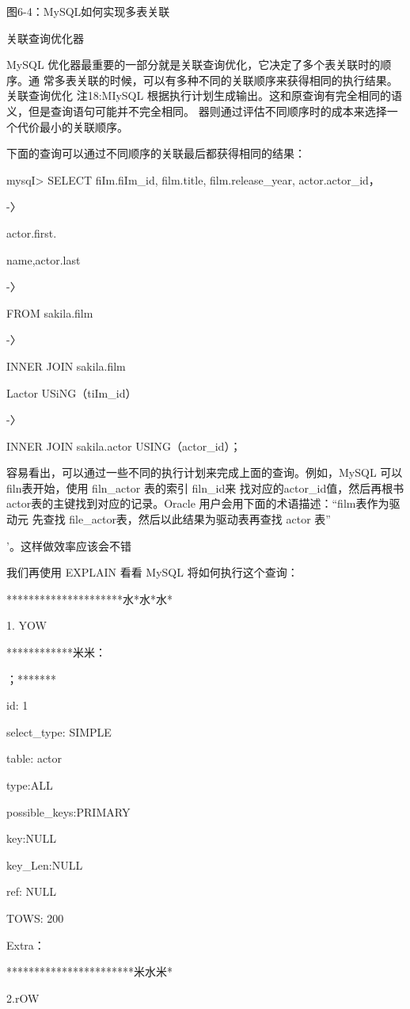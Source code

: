 图6-4：MySQL如何实现多表关联

关联查询优化器

MySQL 优化器最重要的一部分就是关联查询优化，它决定了多个表关联时的顺序。通
常多表关联的时候，可以有多种不同的关联顺序来获得相同的执行结果。关联查询优化
注18:MIySQL 根据执行计划生成输出。这和原查询有完全相同的语义，但是查询语句可能并不完全相同。
器则通过评估不同顺序时的成本来选择一个代价最小的关联顺序。

下面的查询可以通过不同顺序的关联最后都获得相同的结果：

mysqI> SELECT fiIm.fiIm\_id, film.title, film.release\_year, actor.actor\_id，

-〉

actor.first.

name,actor.last

-〉

FROM sakila.film

-〉

INNER JOIN sakila.film

Lactor USiNG（tiIm\_id）

-〉

INNER JOIN sakila.actor USING（actor\_id）；

容易看出，可以通过一些不同的执行计划来完成上面的查询。例如，MySQL 可以
filn表开始，使用 filn\_actor 表的索引 filn\_id来 找对应的actor\_id值，然后再根书
actor表的主键找到对应的记录。Oracle 用户会用下面的术语描述：“film表作为驱动元
先查找 file\_actor表，然后以此结果为驱动表再查找 actor 表”

’。这样做效率应该会不错

我们再使用 EXPLAIN 看看 MySQL 将如何执行这个查询：

*********************水*水*水*

1. YOW

************米米：

；*******

id: 1

select\_type: SIMPLE

table: actor

type:ALL

possible\_keys:PRIMARY

key:NULL

key\_Len:NULL

ref: NULL

TOWS: 200

Extra：

***********************米水米*

2.rOW

